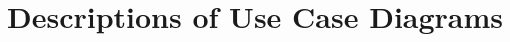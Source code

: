 \documentclass[12pt,openany]{report}
\begin{document}
\section{Descriptions of Use Case Diagrams}
\end{document}
